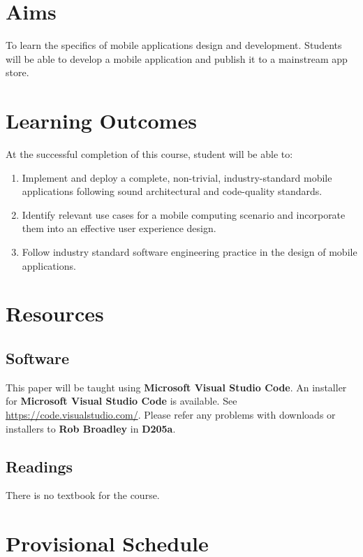 \documentclass{article}
\begin{document}
\section*{Aims}
To learn the specifics of mobile applications design and development. Students will be able to develop a mobile application and publish it to a mainstream app store.

\section*{Learning Outcomes}
At the successful completion of this course, student will be able to:
\begin{enumerate}
  \item Implement and deploy a complete, non-trivial, industry-standard mobile applications following sound architectural and code-quality standards.
  \item Identify relevant use cases for a mobile computing scenario and incorporate them into an effective user experience design.
  \item Follow industry standard software engineering practice in the design of mobile applications.
\end{enumerate}

\section*{Resources}

\subsection*{Software}
This paper will be taught using \textbf{Microsoft Visual Studio Code}. An installer for \textbf{Microsoft Visual Studio Code} is available. See \href{https://code.visualstudio.com/}{https://code.visualstudio.com/}. Please refer any problems with downloads or installers to \textbf{Rob Broadley} in \textbf{D205a}.

\subsection*{Readings}
There is no textbook for the course.

\section*{Provisional Schedule}
\end{document}
